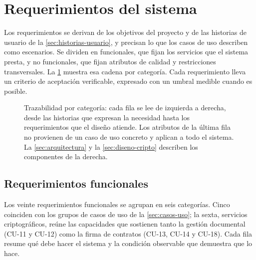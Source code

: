 \section{Requerimientos del sistema}\label{sec:requerimientos}

\newlength{\ReqAncho}
\setlength{\ReqAncho}{\dimexpr(\linewidth-1.55cm-4\tabcolsep)/2\relax}

Los requerimientos se derivan de los objetivos del proyecto y de las historias de usuario de la \cref{sec:historias-usuario}, y precisan lo que los casos de uso describen como escenarios. Se dividen en funcionales, que fijan los servicios que el sistema presta, y no funcionales, que fijan atributos de calidad y restricciones transversales. La \cref{fig:req-trazabilidad} muestra esa cadena por categoría. Cada requerimiento lleva un criterio de aceptación verificable, expresado con un umbral medible cuando es posible.

\begin{figure}[H]
  \centering
  
  \caption{Trazabilidad por categoría: cada fila se lee de izquierda a derecha, desde las historias que expresan la necesidad hasta los requerimientos que el diseño atiende. Los atributos de la última fila no provienen de un caso de uso concreto y aplican a todo el sistema. La \cref{sec:arquitectura} y la \cref{sec:diseno-cripto} describen los componentes de la derecha.}
  \label{fig:req-trazabilidad}
\end{figure}

\subsection{Requerimientos funcionales}\label{sec:requerimientos-funcionales}

Los veinte requerimientos funcionales se agrupan en seis categorías. Cinco coinciden con los grupos de casos de uso de la \cref{sec:casos-uso}; la sexta, servicios criptográficos, reúne las capacidades que sostienen tanto la gestión documental (CU-11 y CU-12) como la firma de contratos (CU-13, CU-14 y CU-18). Cada fila resume qué debe hacer el sistema y la condición observable que demuestra que lo hace.

